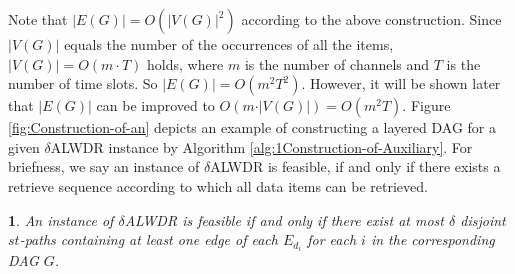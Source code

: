 \documentclass[11pt,english,onecolumn,draftcls]{IEEEtran}
\theoremstyle{plain}
\theoremstyle{plain}
\theoremstyle{plain}
\newtheorem{lem}[thm]{\protect\lemmaname}
\theoremstyle{plain}
\providecommand{\lemmaname}{Lemma}
\begin{document}
Note that $\vert E(G)\vert=O(\vert V(G)\vert^{2})$ according to the
above construction. Since $\vert V(G)\vert$ equals the number of
the occurrences of all the items, $\vert V(G)\vert=O(m\cdot T)$ holds,
where $m$ is the number of channels and $T$ is the number of time
slots. So $\vert E(G)\vert=O(m^{2}T^{2})$. However, it will be shown
later that $|E(G)|$ can be improved to $O(m\cdot\vert V(G)\vert)=O(m^{2}T)$.
Figure \ref{fig:Construction-of-an} depicts an example of constructing
a layered DAG for a given $\delta$ALWDR instance by Algorithm \ref{alg:1Construction-of-Auxiliary}.
For briefness, we say an instance of $\delta$ALWDR is feasible, if
and only if there exists a retrieve sequence according to which all
data items can be retrieved.
\begin{lem}
\label{lem:lwdtokpath}An instance of $\delta$ALWDR is feasible if
and only if there exist at most $\delta$ disjoint $st$-paths containing
at least one edge of each $E_{d_{i}}$ for each $i$ in the corresponding
DAG $G$.\end{lem}
\end{document}
